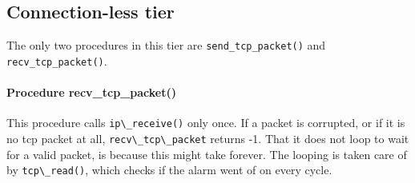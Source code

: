 \documentclass[11pt]{article}
\begin{document}
\paragraph{}


\subsection{Connection-less tier}

The only two procedures in this tier are \lstinline|send_tcp_packet()| and
\lstinline|recv_tcp_packet()|.

\paragraph{Procedure recv\_tcp\_packet()}
This procedure calls \lstinline|ip\_receive()| only once. If a packet is corrupted,
or if it is no tcp packet at all, \lstinline|recv\_tcp\_packet| returns -1.
That it does not loop to wait for a valid packet, is because this might take 
forever. The looping is taken care of by \lstinline|tcp\_read()|, which checks if the alarm 
went of on every cycle.
\end{document}
